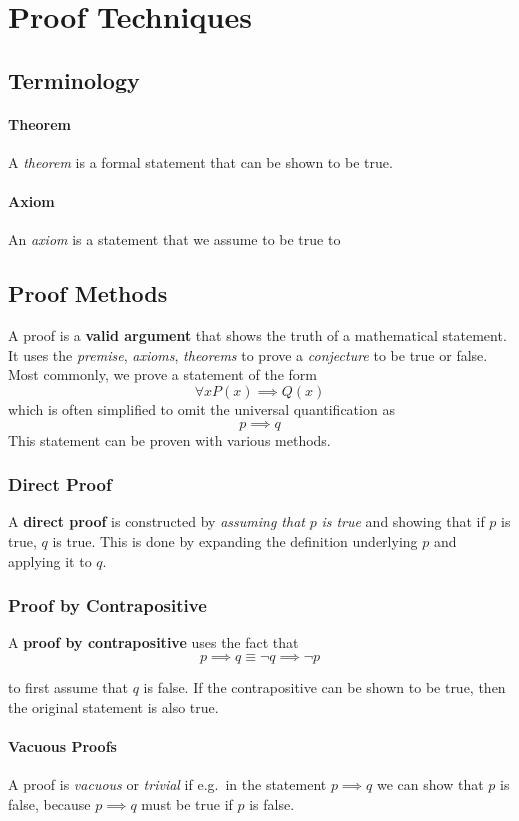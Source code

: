 \section{Proof Techniques}
\subsection{Terminology}
\paragraph{Theorem} A \emph{theorem} is a formal statement that can be shown to be true.
\paragraph{Axiom} An \emph{axiom} is a statement that we assume to be true to 	

\subsection{Proof Methods}\label{sub:proof_methods}
A proof is a \textbf{valid argument} that shows the truth of a mathematical statement. It uses the \emph{premise}, \emph{axioms}, \emph{theorems} to prove a \emph{conjecture} to be true or false. Most commonly, we prove a statement of the form \[
	\forall x P(x) \implies Q(x)
\]
which is often simplified to omit the universal quantification as \[
	p \implies q
\]
This statement can be proven with various methods.
\subsubsection{Direct Proof}\label{ssub:direct_proof}
A \textbf{direct proof} is constructed by \emph{assuming that} \(p\) \emph{is true} and showing that if \(p\) is true, \(q\) is true. This is done by expanding the definition underlying \(p\) and applying it to \(q\).

\subsubsection{Proof by Contrapositive}\label{ssub:proof_by_contrapositive}
A \textbf{proof by contrapositive} uses the fact that \[
p \implies q \equiv \neg q \implies \neg p
\]

to first assume that \( q \) is false. If the contrapositive can be shown to be true, then the original statement is also true.
\paragraph*{Vacuous Proofs} A proof is \emph{vacuous} or \emph{trivial} if e.g.\ in the statement \( p \implies q \) we can show that \( p \) is false, because \( p \implies q \) must be true if \( p \) is false.

